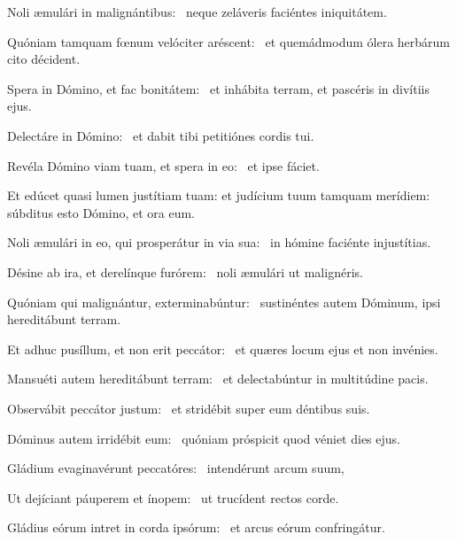 \item Noli æmulári in malignántibus:~\psstar{} neque zeláveris faciéntes iniquitátem.

\item Quóniam tamquam fœnum velóciter aréscent:~\psstar{} et quemádmodum ólera herbárum cito décident.

\item Spera in Dómino, et fac bonitátem:~\psstar{} et inhábita terram, et pascéris in divítiis ejus.

\item Delectáre in Dómino:~\psstar{} et dabit tibi petitiónes cordis tui.

\item Revéla Dómino viam tuam, et spera in eo:~\psstar{} et ipse fáciet.

\item Et edúcet quasi lumen justítiam tuam: et judícium tuum tamquam merídiem:~\psstar{} súbditus esto Dómino, et ora eum.

\item Noli æmulári in eo, qui prosperátur in via sua:~\psstar{} in hómine faciénte injustítias.

\item Désine ab ira, et derelínque furórem:~\psstar{} noli æmulári ut malignéris.

\item Quóniam qui malignántur, exterminabúntur:~\psstar{} sustinéntes autem Dóminum, ipsi hereditábunt terram.

\item Et adhuc pusíllum, et non erit peccátor:~\psstar{} et quæres locum ejus et non invénies.

\item Mansuéti autem hereditábunt terram:~\psstar{} et delectabúntur in multitúdine pacis.

\item Observábit peccátor justum:~\psstar{} et stridébit super eum déntibus suis.

\item Dóminus autem irridébit eum:~\psstar{} quóniam próspicit quod véniet dies ejus.

\item Gládium evaginavérunt peccatóres:~\psstar{} intendérunt arcum suum,

\item Ut dejíciant páuperem et ínopem:~\psstar{} ut trucídent rectos corde.

\item Gládius eórum intret in corda ipsórum:~\psstar{} et arcus eórum confringátur.

